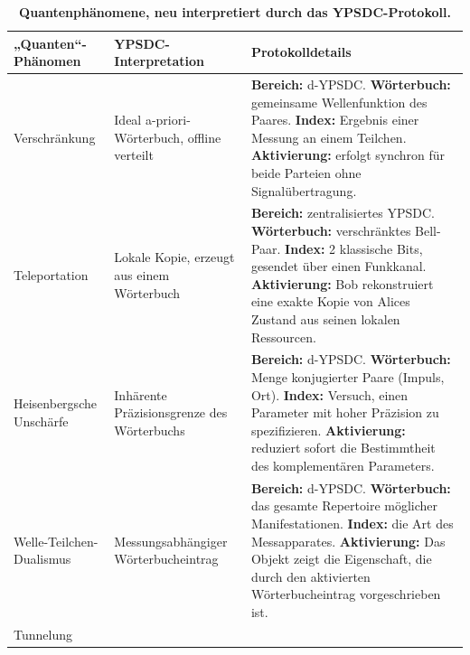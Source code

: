 \documentclass[12pt,a4paper]{article}
\theoremstyle{remark}
\begin{document}
	\begin{table}[htbp]
		\centering
		\caption{\normalsize\textbf{Quantenphänomene, neu interpretiert durch das YPSDC-Protokoll.}}
		\label{tab:quantum-ypsdc}
		\small
		\begin{tabular}{p{2.8cm} p{4.8cm} p{7.8cm}}
			\toprule
			\textbf{„Quanten“-Phänomen} &
			\textbf{YPSDC-Interpretation} &
			\textbf{Protokolldetails} \\
			\midrule
			Verschränkung &
			Ideal a-priori-Wörterbuch, offline verteilt &
			\textbf{Bereich:} d-YPSDC. \newline
			\textbf{Wörterbuch:} gemeinsame Wellenfunktion des Paares. \newline
			\textbf{Index:} Ergebnis einer Messung an einem Teilchen. \newline
			\textbf{Aktivierung:} erfolgt synchron für beide Parteien ohne Signalübertragung. \\
			\midrule
			Teleportation &
			Lokale Kopie, erzeugt aus einem Wörterbuch &
			\textbf{Bereich:} zentralisiertes YPSDC. \newline
			\textbf{Wörterbuch:} verschränktes Bell-Paar. \newline
			\textbf{Index:} 2 klassische Bits, gesendet über einen Funkkanal. \newline
			\textbf{Aktivierung:} Bob rekonstruiert eine exakte Kopie von Alices Zustand aus seinen lokalen Ressourcen. \\
			\midrule
			Heisenbergsche Unschärfe &
			Inhärente Präzisionsgrenze des Wörterbuchs &
			\textbf{Bereich:} d-YPSDC. \newline
			\textbf{Wörterbuch:} Menge konjugierter Paare (Impuls, Ort). \newline
			\textbf{Index:} Versuch, einen Parameter mit hoher Präzision zu spezifizieren. \newline
			\textbf{Aktivierung:} reduziert sofort die Bestimmtheit des komplementären Parameters. \\
			\midrule
			Welle-Teilchen-Dualismus &
			Messungsabhängiger Wörterbucheintrag &
			\textbf{Bereich:} d-YPSDC. \newline
			\textbf{Wörterbuch:} das gesamte Repertoire möglicher Manifestationen. \newline
			\textbf{Index:} die Art des Messapparates. \newline
			\textbf{Aktivierung:} Das Objekt zeigt die Eigenschaft, die durch den aktivierten Wörterbucheintrag vorgeschrieben ist. \\
			\midrule
			Tunnelung &

\end{tabular}
\end{table}
\end{document}
